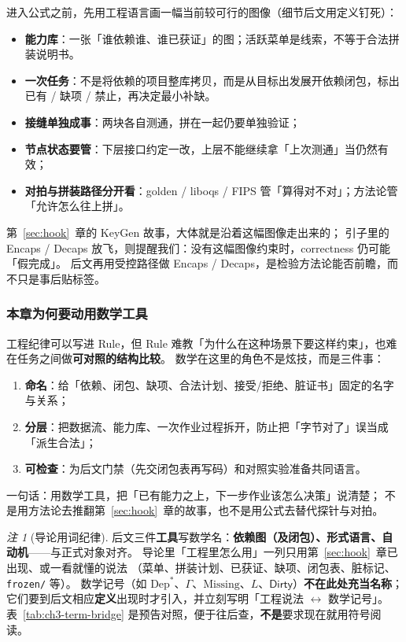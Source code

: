 \documentclass[UTF8,a4paper,11pt]{ctexart}
\theoremstyle{definition}
\theoremstyle{plain}
\theoremstyle{remark}
\newtheorem{remark}{注}[section]
\numberwithin{figure}{section}
\numberwithin{table}{section}
\begin{document}
进入公式之前，先用工程语言画一幅当前较可行的图像（细节后文用定义钉死）：

\begin{itemize}
  \item \textbf{能力库}：一张「谁依赖谁、谁已获证」的图；活跃菜单是线索，不等于合法拼装说明书。
  \item \textbf{一次任务}：不是将依赖的项目整库拷贝，而是从目标出发展开依赖闭包，标出已有 / 缺项 / 禁止，再决定最小补缺。
  \item \textbf{接缝单独成事}：两块各自测通，拼在一起仍要单独验证；
  \item \textbf{节点状态要管}：下层接口约定一改，上层不能继续拿「上次测通」当仍然有效；
  \item \textbf{对拍与拼装路径分开看}：golden / liboqs / FIPS 管「算得对不对」；方法论管「允许怎么往上拼」。
\end{itemize}

第~\ref{sec:hook}~章的 KeyGen 故事，大体就是沿着这幅图像走出来的；
引子里的 Encaps / Decaps 放飞，则提醒我们：没有这幅图像约束时，correctness 仍可能「假完成」。
后文再用受控路径做 Encaps / Decaps，是检验方法论能否前瞻，而不只是事后贴标签。

\subsubsection{本章为何要动用数学工具}

工程纪律可以写进 Rule，但 Rule 难教「为什么在这种场景下要这样约束」，也难在任务之间做\textbf{可对照的结构比较}。
数学在这里的角色不是炫技，而是三件事：

\begin{enumerate}
  \item \textbf{命名}：给「依赖、闭包、缺项、合法计划、接受/拒绝、脏证书」固定的名字与关系；
  \item \textbf{分层}：把数据流、能力库、一次作业过程拆开，防止把「字节对了」误当成「派生合法」；
  \item \textbf{可检查}：为后文门禁（先交闭包表再写码）和对照实验准备共同语言。
\end{enumerate}

一句话：用数学工具，把「已有能力之上，下一步作业该怎么决策」说清楚；
不是用方法论去推翻第~\ref{sec:hook}~章的故事，也不是用公式去替代探针与对拍。

\begin{remark}[导论用词纪律]
后文三件\textbf{工具}写数学名：\textbf{依赖图（及闭包）、形式语言、自动机}——与正式对象对齐。
导论里「工程里怎么用」一列只用第~\ref{sec:hook}~章已出现、或一看就懂的说法
（菜单、拼装计划、已获证、缺项、闭包表、脏标记、\texttt{frozen/} 等）。
数学记号（如 $\mathrm{Dep}^*$、$\Gamma$、$\mathrm{Missing}$、$L$、$\mathsf{Dirty}$）\textbf{不在此处充当名称}；
它们要到后文相应\textbf{定义}出现时才引入，并立刻写明「工程说法 $\leftrightarrow$ 数学记号」。
表~\ref{tab:ch3-term-bridge} 是预告对照，便于往后查，\textbf{不是}要求现在就用符号阅读。
\end{remark}
\end{document}
